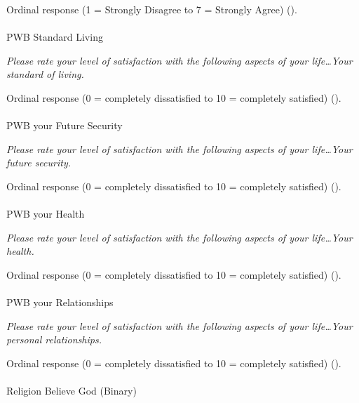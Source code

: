 \documentclass[
  single column]{article}
\makeatletter
\let\oldparagraph\paragraph
\renewcommand{\paragraph}{
    \@ifstar
      \xxxParagraphStar
      \xxxParagraphNoStar
  }
\newcommand{\xxxParagraphStar}[1]{\oldparagraph*{#1}\mbox{}}
\newcommand{\xxxParagraphNoStar}[1]{\oldparagraph{#1}\mbox{}}
\makeatother
\begin{document}
Ordinal response (1 = Strongly Disagree to 7 = Strongly Agree)
().

\paragraph{PWB Standard Living}\label{pwb-standard-living}

\emph{Please rate your level of satisfaction with the following aspects
of your life\ldots Your standard of living.}

Ordinal response (0 = completely dissatisfied to 10 = completely
satisfied) ().

\paragraph{PWB your Future Security}\label{pwb-your-future-security}

\emph{Please rate your level of satisfaction with the following aspects
of your life\ldots Your future security.}

Ordinal response (0 = completely dissatisfied to 10 = completely
satisfied) ().

\paragraph{PWB your Health}\label{pwb-your-health}

\emph{Please rate your level of satisfaction with the following aspects
of your life\ldots Your health.}

Ordinal response (0 = completely dissatisfied to 10 = completely
satisfied) ().

\paragraph{PWB your Relationships}\label{pwb-your-relationships}

\emph{Please rate your level of satisfaction with the following aspects
of your life\ldots Your personal relationships.}

Ordinal response (0 = completely dissatisfied to 10 = completely
satisfied) ().

\paragraph{Religion Believe God
(Binary)}\label{religion-believe-god-binary}
\end{document}
